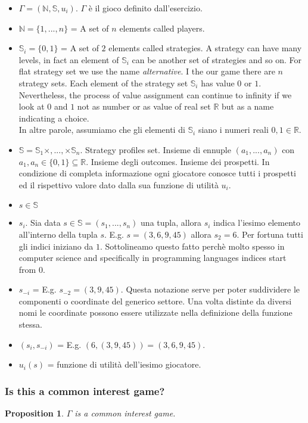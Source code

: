 \documentclass{article}
\newtheorem{prop}{Proposition}
\begin{document}
\begin{itemize}
 \item $\Gamma = (\mathbb{N}, \mathbb{S}, u_i)$. $\Gamma$ \`e il gioco definito dall'esercizio.
 \item $\mathbb{N} = \{1,...,n\}$ = A set of $n$ elements called players.
 \item $\mathbb{S}_i = \{ 0,1 \}$ = A set of $2$ elements called strategies. A strategy can have many levels, in fact an element of $\mathbb{S}_i$ can be another set of strategies and so on. For flat strategy set we use the name \emph{alternative}. I the our game there are $n$ strategy sets. Each element of the strategy set $\mathbb{S}_i$ has value $0$ or $1$. Nevertheless, the process of value assignment can continue to infinity if we look at $0$ and $1$ not as number or as value of real set $\mathbb{R}$ but as a name indicating a choice. \\
 In altre parole, assumiamo che gli elementi di $\mathbb{S}_i$ siano i numeri reali $0,1 \in \mathbb{R}$.
 \item $\mathbb{S} = \mathbb{S}_1 \times, ..., \times \mathbb{S}_n$. Strategy profiles set. Insieme di ennuple $(a_1, ..., a_n)$ con $a_1, a_n \in \{0,1\} \subseteq \mathbb{R}$. Insieme degli outcomes. Insieme dei prospetti. In condizione di completa informazione ogni giocatore conosce tutti i prospetti ed il rispettivo valore dato dalla sua funzione di utilit\`a $u_i$.
 \item $s \in \mathbb{S}$
 \item $s_i$. Sia data $s \in \mathbb{S} = (s_1, ..., s_n)$ una tupla, allora $s_i$ indica l'iesimo elemento all'interno della tupla $s$. E.g. $s=(3,6,9,45)$ allora $s_2 = 6$. Per fortuna tutti gli indici iniziano da $1$. Sottolineamo questo fatto perch\`e molto spesso in computer science and specifically in programming languages indices start from $0$.
 \item $s_{-i}$ = E.g. $s_{-2} = (3,9,45)$. Questa notazione serve per poter suddividere le componenti o coordinate del generico settore. Una volta distinte da diversi nomi le coordinate possono essere utilizzate nella definizione della funzione stessa.
 \item $(s_i, s_{-i})$ = E.g. $(6,(3,9,45)) = (3,6,9,45)$.
 \item $u_i (s)$ = funzione di utilit\`a dell'iesimo giocatore.
\end{itemize}


\subsubsection{Is this a common interest game?}
\begin{prop}
 $\Gamma$ is a common interest game.
\end{prop}
\end{document}
